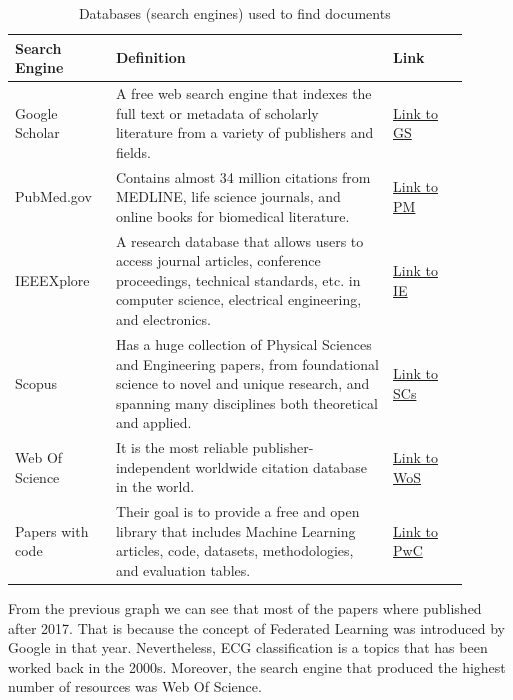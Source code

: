 \begin{table}[H]
\begin{center}
\begin{tabular}{||p{0.2\linewidth} || p{0.55\linewidth} | p{0.15\linewidth}||}
 \hline
\textbf{Search Engine} & \textbf{Definition} & \textbf{Link} \\ [0.4ex] 
 \hline\hline
Google Scholar & A free web search engine that indexes the full text or metadata of scholarly literature from a variety of publishers and fields. & \href{https://scholar.google.com/}{Link to GS} \\
\hline
PubMed.gov & Contains almost 34 million citations from MEDLINE, life science journals, and online books for biomedical literature. & \href{https://pubmed.ncbi.nlm.nih.gov/}{Link to PM} \\
\hline
IEEEXplore & A research database that allows users to access journal articles, conference proceedings, technical standards, etc. in computer science, electrical engineering, and electronics. & \href{https://ieeexplore.ieee.org/Xplore/home.jsp}{Link to IE} \\
\hline
Scopus & Has a huge collection of Physical Sciences and Engineering papers, from foundational science to novel and unique research, and spanning many disciplines both theoretical and applied. & \href{https://www.sciencedirect.com/}{Link to SCs} \\
\hline
Web Of Science & It is the most reliable publisher-independent worldwide citation database in the world. & \href{https://clarivate.com/webofsciencegroup/solutions/web-of-science/}{Link to WoS} \\
\hline
Papers with code & Their goal is to provide a free and open library that includes Machine Learning articles, code, datasets, methodologies, and evaluation tables. & \href{https://paperswithcode.com/}{Link to PwC} \\
\hline\hline
\end{tabular}
\end{center}
\caption{Databases (search engines) used to find documents}
\label{table:dbs_sr}
\end{table}

From the previous graph we can see that most of the papers where published after 2017. That is because the concept of Federated Learning was introduced by Google in that year. Nevertheless, ECG classification is a topics that has been worked back in the 2000s. Moreover, the search engine that produced the highest number of resources was Web Of Science. 

